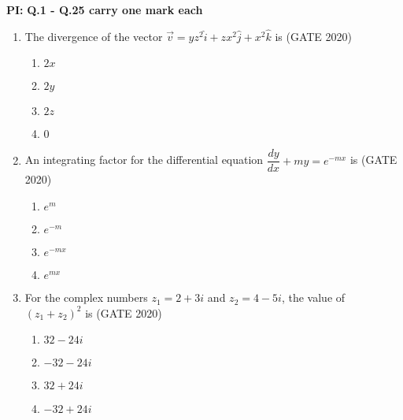 \documentclass[journal,12pt,onecolumn]{IEEEtran}
\theoremstyle{remark}
\begin{document}
\newpage
\textbf{PI:}
\textbf{\large Q.1 - Q.25 carry one mark each}
\begin{enumerate}
  
\item The divergence of the vector $\vec{v} = y z^2 \hat{i} + z x^2 \hat{j} + x^2 \hat{k}$ is 
\hfill{(GATE 2020)}
\begin{multicols}{4}
\begin{enumerate}
    \item $2x$
    \item $2y$
    \item $2z$
    \item $0$
\end{enumerate}
\end{multicols}
\vspace{1cm}

\item An integrating factor for the differential equation $\dfrac{dy}{dx} + my = e^{-mx}$ is  
\hfill{(GATE 2020)}
\begin{multicols}{4}
\begin{enumerate}
    \item $e^{m}$
    \item $e^{-m}$
    \item $e^{-mx}$
    \item $e^{mx}$
\end{enumerate}
\end{multicols}
\vspace{1cm}

\item For the complex numbers $z_1 = 2 + 3i$ and $z_2 = 4 - 5i$, the value of $(z_1 + z_2)^2$ is  
\hfill{(GATE 2020)}
\begin{multicols}{4}
\begin{enumerate}
    \item $32 - 24i$
    \item $-32 - 24i$
    \item $32 + 24i$
    \item $-32 + 24i$
\end{enumerate}
\end{multicols}
\vspace{1cm}


\end{enumerate}
\end{document}
